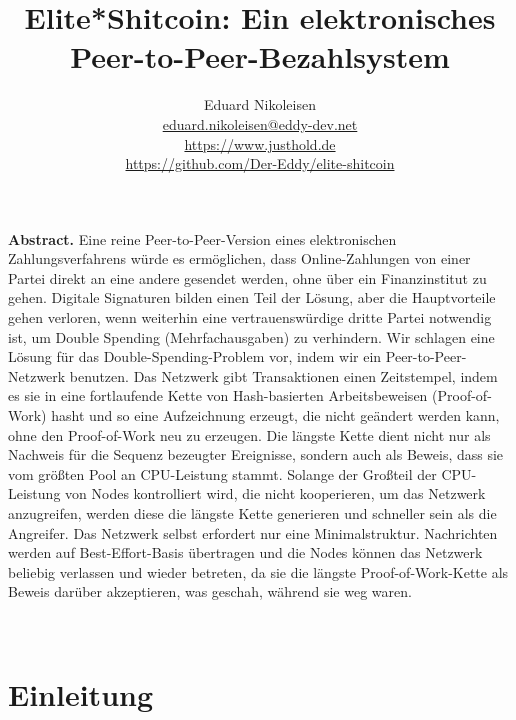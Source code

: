 \documentclass[a4paper, 10pt]{article}
\begin{document}
\renewcommand{\abstractname}{\vspace{-\baselineskip}}

\title{Elite*Shitcoin: Ein elektronisches Peer-to-Peer-Bezahlsystem}
\author{Eduard Nikoleisen \\ 
\href{mailto:eduard.nikoleisen@eddy-dev.net}{eduard.nikoleisen@eddy-dev.net}\\ \url{https://www.justhold.de} \\ \url{https://github.com/Der-Eddy/elite-shitcoin}}
\date{}


\maketitle
\begin{center}
\parbox{0.8\linewidth}{\noindent \textbf{Abstract.} Eine reine Peer-to-Peer-Version eines elektronischen Zahlungsverfahrens würde es ermöglichen, dass Online-Zahlungen von einer Partei direkt an eine andere gesendet werden, ohne über ein Finanzinstitut zu gehen. Digitale Signaturen bilden einen Teil der Lösung, aber die Hauptvorteile gehen verloren, wenn weiterhin eine vertrauenswürdige dritte Partei notwendig ist, um Double Spending (Mehrfachausgaben) zu verhindern. Wir schlagen eine Lösung für das Double-Spending-Problem vor, indem wir ein Peer-to-Peer-Netzwerk benutzen. Das Netzwerk gibt Transaktionen einen Zeitstempel, indem es sie in eine fortlaufende Kette von Hash-basierten Arbeitsbeweisen (Proof-of-Work) hasht und so eine Aufzeichnung erzeugt, die nicht geändert werden kann, ohne den Proof-of-Work neu zu erzeugen. Die längste Kette dient nicht nur als Nachweis für die Sequenz bezeugter Ereignisse, sondern auch als Beweis, dass sie vom größten Pool an CPU-Leistung stammt. Solange der Großteil der CPU-Leistung von Nodes kontrolliert wird, die nicht kooperieren, um das Netzwerk anzugreifen, werden diese die längste Kette generieren und schneller sein als die Angreifer. Das Netzwerk selbst erfordert nur eine Minimalstruktur. Nachrichten werden auf Best-Effort-Basis übertragen und die Nodes können das Netzwerk beliebig verlassen und wieder betreten, da sie die längste Proof-of-Work-Kette als Beweis darüber akzeptieren, was geschah, während sie weg waren. }
\end{center}

\

\section{Einleitung}\label{introduction}
\end{document}
